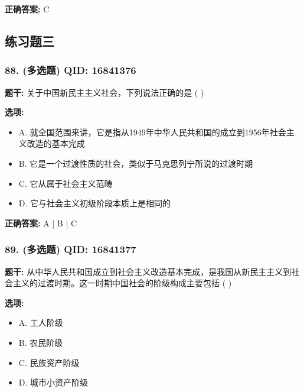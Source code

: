 \documentclass[12pt,UTF8]{ctexart}
\begin{document}
\textbf{正确答案:}
C

\vspace{0.3em}\hrulefill\vspace{0.7em}

\subsection*{练习题三}

\subsubsection*{88. (多选题) \small QID: 16841376}

\textbf{题干:}
关于中国新民主主义社会，下列说法正确的是 ( )

\textbf{选项:}
\begin{itemize}[leftmargin=*]

  \item A. 就全国范围来讲，它是指从1949年中华人民共和国的成立到1956年社会主义改造的基本完成

  \item B. 它是一个过渡性质的社会，类似于马克思列宁所说的过渡时期

  \item C. 它从属于社会主义范畴

  \item D. 它与社会主义初级阶段本质上是相同的

\end{itemize}

\textbf{正确答案:}
A | B | C

\vspace{0.3em}\hrulefill\vspace{0.7em}

\subsubsection*{89. (多选题) \small QID: 16841377}

\textbf{题干:}
从中华人民共和国成立到社会主义改造基本完成，是我国从新民主主义到社会主义的过渡时期。这一时期中国社会的阶级构成主要包括 ( )

\textbf{选项:}
\begin{itemize}[leftmargin=*]

  \item A. 工人阶级

  \item B. 农民阶级

  \item C. 民族资产阶级

  \item D. 城市小资产阶级

\end{itemize}
\end{document}
